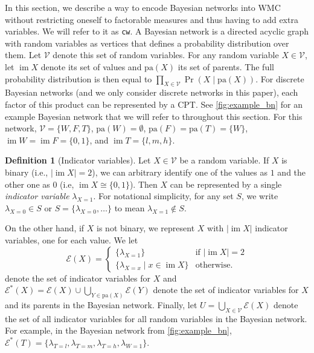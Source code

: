 \documentclass{uai2021} %
\theoremstyle{definition}
\newtheorem{definition}{Definition}
\DeclareMathOperator{\im}{im}
\begin{document}
In this section, we describe a way to encode Bayesian networks into WMC without
restricting oneself to factorable measures and thus having to add extra
variables. We will refer to it as \texttt{cw}. A Bayesian network is a directed
acyclic graph with random variables as vertices that defines a probability
distribution over them. Let $\mathcal{V}$ denote this set of random variables.
For any random variable $X \in \mathcal{V}$, let $\im X$ denote its set of
values and $\mathrm{pa}(X)$ its set of parents. The full probability
distribution is then equal to $\prod_{X \in \mathcal{V}} \Pr(X \mid
\mathrm{pa}(X))$. For discrete Bayesian networks (and we only consider discrete
networks in this paper), each factor of this product can be represented by a
CPT. See \cref{fig:example_bn} for an example Bayesian network that we will
refer to throughout this section. For this network, $\mathcal{V} = \{ W, F, T
\}$, $\mathrm{pa}(W) = \emptyset$, $\mathrm{pa}(F) = \mathrm{pa}(T) = \{ W \}$,
$\im W = \im F = \{0, 1 \}$, and $\im T = \{ l, m, h \}$.

\begin{definition}[Indicator variables]
  Let $X \in \mathcal{V}$ be a random variable. If $X$ is binary (i.e., $|\im X|
  = 2$), we can arbitrary identify one of the values as $1$ and the other one as
  $0$ (i.e, $\im X \cong \{ 0, 1 \}$). Then $X$ can be represented by a single
  \emph{indicator variable} $\lambda_{X=1}$. For notational simplicity, for any
  set $S$, we write $\lambda_{X=0} \in S$ or $S = \{ \lambda_{X=0}, \dots \}$ to
  mean $\lambda_{X=1} \not\in S$.

  On the other hand, if $X$ is not binary, we represent $X$ with $|\im X|$
  indicator variables, one for each value. We let
  \[
    \mathcal{E}(X) = \begin{cases}
      \{ \lambda_{X=1} \} & \text{if } |\im X| = 2 \\
      \{ \lambda_{X=x} \mid x \in \im X \} & \text{otherwise.}
    \end{cases}
  \]
  denote the set of indicator variables for $X$ and $\mathcal{E}^*(X) =
  \mathcal{E}(X) \cup \bigcup_{Y \in \mathrm{pa}(X)} \mathcal{E}(Y)$ denote the
  set of indicator variables for $X$ and its parents in the Bayesian network.
  Finally, let $U = \bigcup_{X \in \mathcal{V}} \mathcal{E}(X)$ denote the set
  of all indicator variables for all random variables in the Bayesian network.
  For example, in the Bayesian network from \cref{fig:example_bn},
  $\mathcal{E}^*(T) = \{ \lambda_{T=l}, \lambda_{T=m}, \lambda_{T=h},
  \lambda_{W=1} \}$.
\end{definition}
\end{document}
